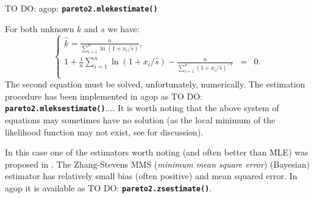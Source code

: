 \documentclass[11pt]{article}\usepackage{graphicx, color}
\newcommand{\hlfunctioncall}[1]{\textcolor[rgb]{0.501960784313725,0,0.329411764705882}{\textbf{#1}}}%
\newcommand{\package}[1]{\textsf{#1}\xspace}
\newcommand{\Rfunc}[1]{\texttt{\hlfunctioncall{#1}}}
\newcommand{\vect}[1]{{\mathbf{#1}}}
\theoremstyle{remark}
\theoremstyle{definition}
\begin{document}
TO DO: \package{agop}: 
\Rfunc{pareto2.mle\-kestimate()}

\bigskip
For both unknown $k$ and $s$ we have:
\begin{equation}\label{Eq:rownaniapochMLE}
\left\{
\begin{array}{lll}
\widehat{k} = \frac{n}{\sum_{i=1}^n \ln\left(1+x_i/\widehat{s}\right)}, \\
1+\frac{1}{n} \sum_{i=1}^n \ln\left(1+x_i/\widehat{s}\right) - \frac{n}{\sum_{i=1}^n \left(1+x_i/\widehat{s}\right)^{-1}}  &=& 0. \\
\end{array}\right.
\end{equation}
The second equation must be solved, unfortunately, numerically.
The estimation 
procedure has been implemented in \package{agop} as TO DO: \Rfunc{pareto2.mleksestimate()}....
It is worth noting that the above system of equations may sometimes
have no solution (as the local minimum of the likelihood function may not exist,
see \cite{CastilloDaoudi2009:mlegpd} for discussion).

In this case one of the estimators worth noting (and often better than MLE) was proposed
in \cite{ZhangStevens2009:estgpd}.
The Zhang-Stevens MMS (\textit{minimum mean square error}) (Bayesian)
estimator has relatively small bias (often positive) and mean squared error.
In \package{agop} it is available as TO DO: \Rfunc{pareto2.zsestimate()}.

% 
\end{document}
